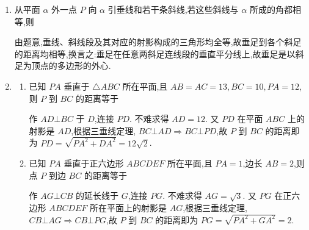 \begin{enumerate}
\begin{enumerate}
        \begin{jieda}
            连接 ${AC},{BD}$ 交于点 $E$,连接 ${PE}.{AE}$ 是 ${PE}$ 在平面 ${ABCD}$ 上的射影,由三垂线定理, ${BD}\bot {AE} \Longrightarrow  {BD}$  $\bot {PE}.\bigtriangleup {ABD}$ 是等边三角形,故 ${AE} = 5\sqrt{3}{{cm}},P$ 到 ${BD}$ 的距离 ${PE} = \sqrt{A{P}^{2} + A{E}^{2}} = {10}{{cm}}$. 作 ${AF}\bot {CD}$ 延长线于点 $F$,连接 ${PF}.{AF}$ 是 ${PF}$ 在平面 ${ABCD}$ 上的射影,由三垂线定理, ${AF} \bot  {CD} \Longrightarrow  {PF} \bot  {CD}$. 不难求得, ${AF} = {AE} = 5\sqrt{3}$  ${{cm}}$,故 $P$ 到 ${DC}$ 的距离 ${PF} = {PE} = {10}{{cm}}$.
        \end{jieda}
    \end{enumerate}

    \item 从平面 $\alpha$ 外一点 $P$ 向 $\alpha$ 引垂线和若干条斜线,若这些斜线与 $\alpha$ 所成的角都相等,则
    \begin{jieda}
        由题意,垂线、斜线段及其对应的射影构成的三角形均全等,故垂足到各个斜足的距离均相等,换言之:垂足在任意两斜足连线段的垂直平分线上,故垂足是以斜足为顶点的多边形的外心.
    \end{jieda}
    \item \begin{enumerate}
        \item 已知 ${PA}$ 垂直于 $\bigtriangleup  {ABC}$ 所在平面,且 ${AB} = {AC} = {13},{BC} = {10},{PA} = {12}$,则 $P$ 到 ${BC}$ 的距离等于
        \begin{jieda}
            作 ${AD}\bot {BC}$ 于 $D$,连接 ${PD}$. 不难求得 ${AD} = {12}$. 又 ${PD}$ 在平面 ${ABC}$ 上的射影是 ${AD}$,根据三垂线定理, ${BC} \bot  {AD} \Longrightarrow  {BC} \bot  {PD}$,故 $P$ 到 ${BC}$ 的距离即为 ${PD} = \sqrt{P{A}^{2} + D{A}^{2}} = {12}\sqrt{2}$.
        \end{jieda}
        \item 已知 ${PA}$ 垂直于正六边形 ${ABCDEF}$ 所在平面,且 ${PA} = 1$,边长 ${AB} = 2$,则点 $P$ 到边 ${BC}$ 的距离等于
        \begin{jieda}
            作 ${AG} \bot  {CB}$ 的延长线于 $G$,连接 ${PG}$. 不难求得 ${AG} = \sqrt{3}$. 又 ${PG}$ 在正六边形 ${ABCDEF}$ 所在平面上的射影是 ${AG}$,根据三垂线定理, ${CB} \bot  {AG} \Longrightarrow  {CB} \bot  {PG}$,故 $P$ 到 ${BC}$ 的距离即为 ${PG} = \sqrt{P{A}^{2} + G{A}^{2}} = 2$.
        \end{jieda}

\end{enumerate}
\end{enumerate}
